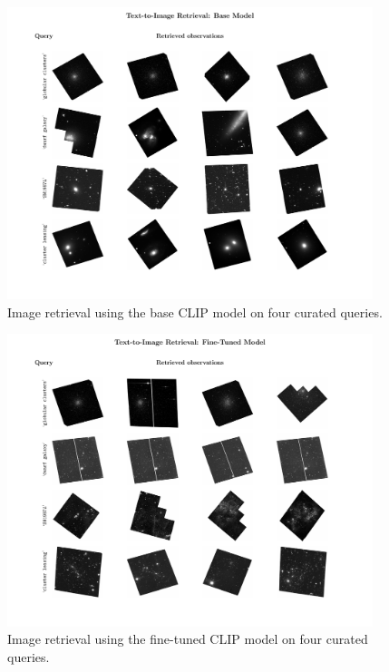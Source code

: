 \documentclass[10pt]{article} %
\begin{document}
\begin{figure}[!h]
\includegraphics[width=0.95\textwidth]{plots/tti_base.pdf}
\caption{Image retrieval using the base CLIP model on four curated queries.}
\label{fig:tti_base}
\end{figure}

\begin{figure}[!h]
\includegraphics[width=0.95\textwidth]{plots/tti.pdf}
\caption{Image retrieval using the fine-tuned CLIP model on four curated queries.}
\label{fig:tti}
\end{figure}
\end{document}
